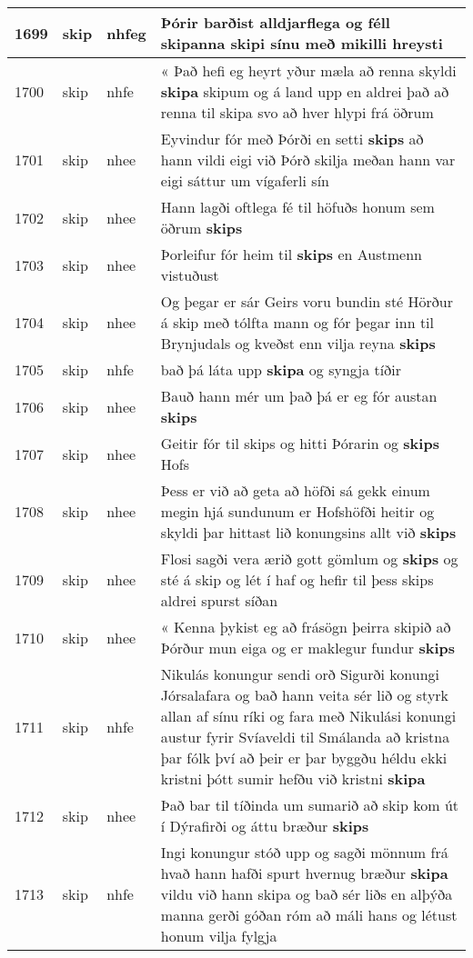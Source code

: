 \documentclass{article}
\begin{document}
\begin{longtable}{p{1cm}|p{1cm}|p{1cm}|p{13cm}}
\hline
1699&skip&nhfeg&Þórir barðist alldjarflega og féll \textbf{skipanna} skipi sínu með mikilli hreysti\\
\hline
1700&skip&nhfe&« Það hefi eg heyrt yður mæla að renna skyldi \textbf{skipa} skipum og á land upp en aldrei það að renna til skipa svo að hver hlypi frá öðrum\\
\hline
1701&skip&nhee&Eyvindur fór með Þórði en setti \textbf{skips} að hann vildi eigi við Þórð skilja meðan hann var eigi sáttur um vígaferli sín\\
\hline
1702&skip&nhee&Hann lagði oftlega fé til höfuðs honum sem öðrum \textbf{skips} \\
\hline
1703&skip&nhee&Þorleifur fór heim til \textbf{skips} en Austmenn vistuðust\\
\hline
1704&skip&nhee&Og þegar er sár Geirs voru bundin sté Hörður á skip með tólfta mann og fór þegar inn til Brynjudals og kveðst enn vilja reyna \textbf{skips} \\
\hline
1705&skip&nhfe&bað þá láta upp \textbf{skipa} og syngja tíðir\\
\hline
1706&skip&nhee&Bauð hann mér um það þá er eg fór austan \textbf{skips} \\
\hline
1707&skip&nhee&Geitir fór til skips og hitti Þórarin og \textbf{skips} Hofs\\
\hline
1708&skip&nhee&Þess er við að geta að höfði sá gekk einum megin hjá sundunum er Hofshöfði heitir og skyldi þar hittast lið konungsins allt við \textbf{skips} \\
\hline
1709&skip&nhee&Flosi sagði vera ærið gott gömlum og \textbf{skips} og sté á skip og lét í haf og hefir til þess skips aldrei spurst síðan\\
\hline
1710&skip&nhee&« Kenna þykist eg að frásögn þeirra skipið að Þórður mun eiga og er maklegur fundur \textbf{skips} \\
\hline
1711&skip&nhfe&Nikulás konungur sendi orð Sigurði konungi Jórsalafara og bað hann veita sér lið og styrk allan af sínu ríki og fara með Nikulási konungi austur fyrir Svíaveldi til Smálanda að kristna þar fólk því að þeir er þar byggðu héldu ekki kristni þótt sumir hefðu við kristni \textbf{skipa} \\
\hline
1712&skip&nhee&Það bar til tíðinda um sumarið að skip kom út í Dýrafirði og áttu bræður \textbf{skips} \\
\hline
1713&skip&nhfe&Ingi konungur stóð upp og sagði mönnum frá hvað hann hafði spurt hvernug bræður \textbf{skipa} vildu við hann skipa og bað sér liðs en alþýða manna gerði góðan róm að máli hans og létust honum vilja fylgja\\

\end{longtable}
\end{document}
